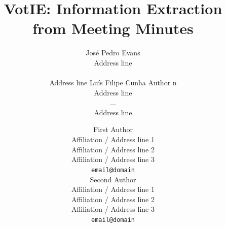 \documentclass[11pt]{article}
\title{VotIE: Information Extraction from Meeting Minutes}
\author{José Pedro Evans \\ Address line \\   \\ Address line \And
          \And  Luís Filipe Cunha \And
         Author n \\ Address line \\ ... \\ Address line}
\author{First Author \\
  Affiliation / Address line 1 \\
  Affiliation / Address line 2 \\
  Affiliation / Address line 3 \\
  \texttt{email@domain} \\\And
  Second Author \\
  Affiliation / Address line 1 \\
  Affiliation / Address line 2 \\
  Affiliation / Address line 3 \\
  \texttt{email@domain} \\}
\begin{document}
\maketitle


\begin{abstract}



\end{abstract}
\end{document}
